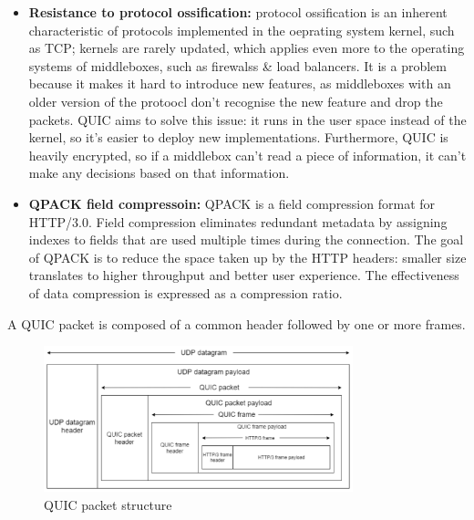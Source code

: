 \documentclass[a4paper,11pt]{article}
\begin{document}
\begin{itemize}
    \item   \textbf{Resistance to protocol ossification:} protocol ossification is an inherent characteristic of protocols implemented in the oeprating system kernel, such as TCP;
            kernels are rarely updated, which applies even more to the operating systems of middleboxes, such as firewalss \& load balancers.
            It is a problem because it makes it hard to introduce new features, as middleboxes with an older version of the protoocl don't recognise the new feature and drop the packets.
            QUIC aims to solve this issue:
            it runs in the user space instead of the kernel, so it's easier to deploy new implementations.
            Furthermore, QUIC is heavily encrypted, so if a middlebox can't read a piece of information, it can't make any decisions based on that information.

    \item   \textbf{QPACK field compressoin:} QPACK is a field compression format for HTTP/3.0.
            Field compression eliminates redundant metadata by assigning indexes to fields that are used multiple times during the connection.
            The goal of QPACK is to reduce the space taken up by the HTTP headers:
            smaller size translates to higher throughput and better user experience.
            The effectiveness of data compression is expressed as a compression ratio.
\end{itemize}

A QUIC packet is composed of a common header followed by one or more frames.
\begin{figure}[H]
    \centering
    \includegraphics[width=0.8\textwidth]{./images/quicpacket.png}
    \caption{QUIC packet structure}
\end{figure}
\end{document}
